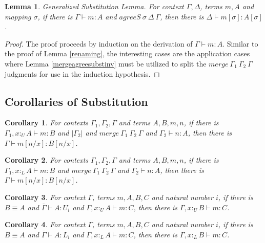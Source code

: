 \documentclass{article}
\newtheorem{corollary}{Corollary}[theorem]
\newtheorem{lemma}[theorem]{Lemma}
\theoremstyle{definition}
\newcommand{\pure}[1]{|#1|}
\newcommand{\utype}{:_{\scriptscriptstyle U}}
\newcommand{\ltype}{:_{\scriptscriptstyle L}}
\newcommand{\mrg}[3]{merge\ {#1}\ {#2}\ {#3}}
\begin{document}
\begin{lemma}
  Generalized Substitution Lemma. For context $\Gamma, \Delta$, terms $m, A$ and mapping $\sigma$, if there is $\Gamma \vdash m : A$ and $agreeS\ \sigma\ \Delta\ \Gamma$, then there is $\Delta \vdash m[\sigma] : A[\sigma]$.
\end{lemma}
\begin{proof}
  The proof proceeds by induction on the derivation of $\Gamma \vdash m : A$. Similar to the proof of Lemma \ref{renaming}, the interesting cases are the application cases where Lemma \ref{mergeagreesubstinv} must be utilized to split the $\mrg{\Gamma_1}{\Gamma_2}{\Gamma}$ judgments for use in the induction hypothesis.
\end{proof}

\subsection{Corollaries of Substitution}

\begin{corollary}\label{substitutionu}
  For contexts $\Gamma_1, \Gamma_2, \Gamma$ and terms $A, B, m, n$, if there is $\Gamma_1, x \utype A \vdash m : B$ and $\pure{\Gamma_2}$ and $\mrg{\Gamma_1}{\Gamma_2}{\Gamma}$ and $\Gamma_2 \vdash n : A$, then there is $\Gamma \vdash m[n/x]: B[n/x]$.
\end{corollary}

\begin{corollary}\label{substitutionl}
  For contexts $\Gamma_1, \Gamma_2, \Gamma$ and terms $A, B, m, n$, if there is $\Gamma_1, x \ltype A \vdash m : B$ and $\mrg{\Gamma_1}{\Gamma_2}{\Gamma}$ and $\Gamma_2 \vdash n : A$, then there is $\Gamma \vdash m[n/x]: B[n/x]$.
\end{corollary}

\begin{corollary}\label{contextconvu}
  For context $\Gamma$, terms $m, A, B, C$ and natural number $i$, if there is $B \equiv A$ and $\overline{\Gamma} \vdash A : U_i$ and $\Gamma, x \utype A \vdash m : C$, then there is $\Gamma, x \utype B \vdash m : C$.
\end{corollary}

\begin{corollary}\label{contextconvl}
  For context $\Gamma$, terms $m, A, B, C$ and natural number $i$, if there is $B \equiv A$ and $\overline{\Gamma} \vdash A : L_i$ and $\Gamma, x \ltype A \vdash m : C$, then there is $\Gamma, x \ltype B \vdash m : C$.
\end{corollary}
\end{document}
